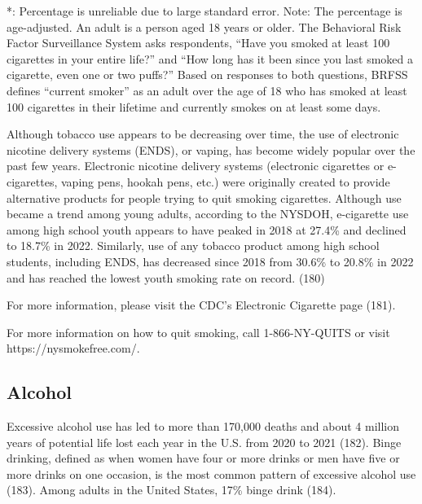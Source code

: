 \documentclass[
  english,
  letterpaper,
]{report}
\begin{document}
\begin{tcolorbox}[enhanced jigsaw, breakable, leftrule=.75mm, title=\textcolor{quarto-callout-note-color}{\faInfo}\hspace{0.5em}{Note}, bottomrule=.15mm, opacityback=0, left=2mm, colback=white, bottomtitle=1mm, coltitle=black, colbacktitle=quarto-callout-note-color!10!white, colframe=quarto-callout-note-color-frame, opacitybacktitle=0.6, toptitle=1mm, titlerule=0mm, arc=.35mm, rightrule=.15mm, toprule=.15mm]

*: Percentage is unreliable due to large standard error. Note: The
percentage is age-adjusted. An adult is a person aged 18 years or older.
The Behavioral Risk Factor Surveillance System asks respondents, ``Have
you smoked at least 100 cigarettes in your entire life?'' and ``How long
has it been since you last smoked a cigarette, even one or two puffs?''
Based on responses to both questions, BRFSS defines ``current smoker''
as an adult over the age of 18 who has smoked at least 100 cigarettes in
their lifetime and currently smokes on at least some days.

\end{tcolorbox}

Although tobacco use appears to be decreasing over time, the use of
electronic nicotine delivery systems (ENDS), or vaping, has become
widely popular over the past few years. Electronic nicotine delivery
systems (electronic cigarettes or e-cigarettes, vaping pens, hookah
pens, etc.) were originally created to provide alternative products for
people trying to quit smoking cigarettes. Although use became a trend
among young adults, according to the NYSDOH, e-cigarette use among high
school youth appears to have peaked in 2018 at 27.4\% and declined to
18.7\% in 2022. Similarly, use of any tobacco product among high school
students, including ENDS, has decreased since 2018 from 30.6\% to 20.8\%
in 2022 and has reached the lowest youth smoking rate on record. (180)

For more information, please visit the CDC's Electronic Cigarette page
(181).

For more information on how to quit smoking, call 1-866-NY-QUITS or
visit https://nysmokefree.com/.

\subsection{Alcohol}\label{alcohol}

Excessive alcohol use has led to more than 170,000 deaths and about 4
million years of potential life lost each year in the U.S. from 2020 to
2021 (182). Binge drinking, defined as when women have four or more
drinks or men have five or more drinks on one occasion, is the most
common pattern of excessive alcohol use (183). Among adults in the
United States, 17\% binge drink (184).
\end{document}
